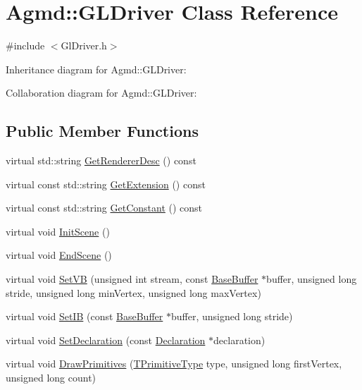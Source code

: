 \hypertarget{class_agmd_1_1_g_l_driver}{\section{Agmd\+:\+:G\+L\+Driver Class Reference}
\label{class_agmd_1_1_g_l_driver}
}


{\ttfamily \#include $<$Gl\+Driver.\+h$>$}



Inheritance diagram for Agmd\+:\+:G\+L\+Driver\+:


Collaboration diagram for Agmd\+:\+:G\+L\+Driver\+:
\subsection*{Public Member Functions}
\begin{DoxyCompactItemize}
\item 
virtual std\+::string \hyperlink{class_agmd_1_1_g_l_driver_a7f34ce6d173642e11ac9795fe7acc59d}{Get\+Renderer\+Desc} () const 
\item 
virtual const std\+::string \hyperlink{class_agmd_1_1_g_l_driver_a760ded3d771343d171cd43e308326398}{Get\+Extension} () const 
\item 
virtual const std\+::string \hyperlink{class_agmd_1_1_g_l_driver_abf2bff50bf8cc4428c6f26f077274796}{Get\+Constant} () const 
\item 
virtual void \hyperlink{class_agmd_1_1_g_l_driver_a4095bb84f37f1ed2dce478d4618ebb2f}{Init\+Scene} ()
\item 
virtual void \hyperlink{class_agmd_1_1_g_l_driver_ab6e2d7fcf613c056a2172eeaf48816b4}{End\+Scene} ()
\item 
virtual void \hyperlink{class_agmd_1_1_g_l_driver_a8a5b85d5128c13de54ffad58c3e54c7b}{Set\+V\+B} (unsigned int stream, const \hyperlink{class_agmd_1_1_base_buffer}{Base\+Buffer} $\ast$buffer, unsigned long stride, unsigned long min\+Vertex, unsigned long max\+Vertex)
\item 
virtual void \hyperlink{class_agmd_1_1_g_l_driver_abe6eae14930800c02a9ba02b9a50ba0f}{Set\+I\+B} (const \hyperlink{class_agmd_1_1_base_buffer}{Base\+Buffer} $\ast$buffer, unsigned long stride)
\item 
virtual void \hyperlink{class_agmd_1_1_g_l_driver_aae27a98b3d696f5ad82257ad55133895}{Set\+Declaration} (const \hyperlink{class_agmd_1_1_declaration}{Declaration} $\ast$declaration)
\item 
virtual void \hyperlink{class_agmd_1_1_g_l_driver_adae2a75d7f71fad8e717c0f8a7ad895d}{Draw\+Primitives} (\hyperlink{namespace_agmd_a0e38d0c34891ddd6eef72e1c9e55161c}{T\+Primitive\+Type} type, unsigned long first\+Vertex, unsigned long count)

\end{DoxyCompactItemize}
